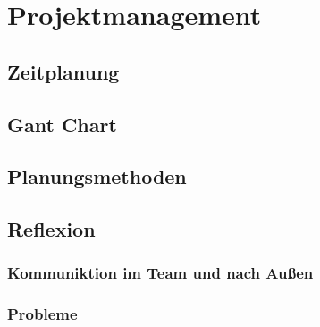 \section{Projektmanagement}
\subsection{Zeitplanung}
\subsection{Gant Chart}
\subsection{Planungsmethoden}
\subsection{Reflexion}
\subsubsection{Kommuniktion im Team und nach Außen}
\subsubsection{Probleme}